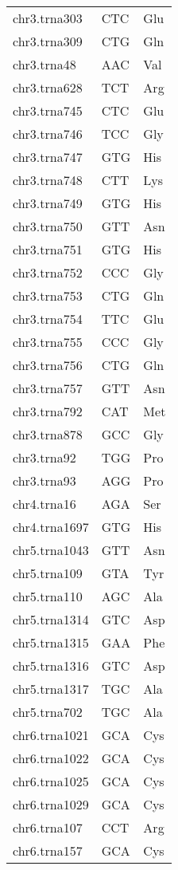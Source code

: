 \begin{longtable}{@{}l>{\collectcell\anticodon}l<{\endcollectcell}l@{}}
    chr3.trna303 & CTC & Glu \\
    chr3.trna309 & CTG & Gln \\
    chr3.trna48 & AAC & Val \\
    chr3.trna628 & TCT & Arg \\
    chr3.trna745 & CTC & Glu \\
    chr3.trna746 & TCC & Gly \\
    chr3.trna747 & GTG & His \\
    chr3.trna748 & CTT & Lys \\
    chr3.trna749 & GTG & His \\
    chr3.trna750 & GTT & Asn \\
    chr3.trna751 & GTG & His \\
    chr3.trna752 & CCC & Gly \\
    chr3.trna753 & CTG & Gln \\
    chr3.trna754 & TTC & Glu \\
    chr3.trna755 & CCC & Gly \\
    chr3.trna756 & CTG & Gln \\
    chr3.trna757 & GTT & Asn \\
    chr3.trna792 & CAT & Met \\
    chr3.trna878 & GCC & Gly \\
    chr3.trna92 & TGG & Pro \\
    chr3.trna93 & AGG & Pro \\
    chr4.trna16 & AGA & Ser \\
    chr4.trna1697 & GTG & His \\
    chr5.trna1043 & GTT & Asn \\
    chr5.trna109 & GTA & Tyr \\
    chr5.trna110 & AGC & Ala \\
    chr5.trna1314 & GTC & Asp \\
    chr5.trna1315 & GAA & Phe \\
    chr5.trna1316 & GTC & Asp \\
    chr5.trna1317 & TGC & Ala \\
    chr5.trna702 & TGC & Ala \\
    chr6.trna1021 & GCA & Cys \\
    chr6.trna1022 & GCA & Cys \\
    chr6.trna1025 & GCA & Cys \\
    chr6.trna1029 & GCA & Cys \\
    chr6.trna107 & CCT & Arg \\
    chr6.trna157 & GCA & Cys \\

\end{longtable}

